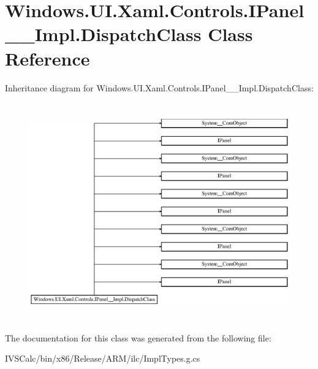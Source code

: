 \hypertarget{class_windows_1_1_u_i_1_1_xaml_1_1_controls_1_1_i_panel_____impl_1_1_dispatch_class}{}\section{Windows.\+U\+I.\+Xaml.\+Controls.\+I\+Panel\+\_\+\+\_\+\+Impl.\+Dispatch\+Class Class Reference}
\label{class_windows_1_1_u_i_1_1_xaml_1_1_controls_1_1_i_panel_____impl_1_1_dispatch_class}
Inheritance diagram for Windows.\+U\+I.\+Xaml.\+Controls.\+I\+Panel\+\_\+\+\_\+\+Impl.\+Dispatch\+Class\+:\begin{figure}[H]
\begin{center}
\leavevmode
\includegraphics[height=9.418961cm]{class_windows_1_1_u_i_1_1_xaml_1_1_controls_1_1_i_panel_____impl_1_1_dispatch_class}
\end{center}
\end{figure}


The documentation for this class was generated from the following file\+:\begin{DoxyCompactItemize}
\item 
I\+V\+S\+Calc/bin/x86/\+Release/\+A\+R\+M/ilc/Impl\+Types.\+g.\+cs\end{DoxyCompactItemize}
